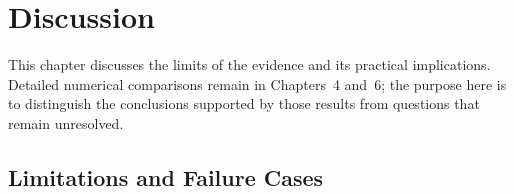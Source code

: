 \chapter{Discussion}
\label{chap:discussion}

\begin{greenrevision}
This chapter discusses the limits of the evidence and its practical implications. Detailed numerical comparisons remain in Chapters~4 and~6; the purpose here is to distinguish the conclusions supported by those results from questions that remain unresolved.
\end{greenrevision}

\section{Limitations and Failure Cases}
\label{sec:discussion-limitations}

